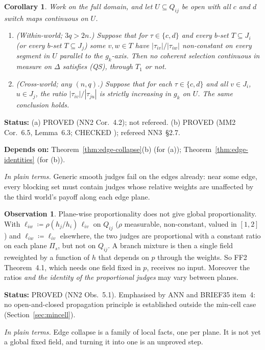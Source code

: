 \documentclass[11pt]{article}
\newtheorem{corollary}[theorem]{Corollary}
\theoremstyle{definition}
\newtheorem{observation}[theorem]{Observation}
\theoremstyle{remark}
\newcommand{\src}[1]{\textsf{#1}}
\newcommand{\status}[1]{\par\smallskip\noindent\textbf{Status:} #1\par}
\newcommand{\deps}[1]{\noindent\textbf{Depends on:} #1\par}
\newcommand{\inwords}[1]{\noindent\textit{In plain terms.} #1\par\smallskip}
\newcommand{\QS}{\textup{(QS)}}
\begin{document}
\begin{corollary}\label{cor:edge-exclusions}
Work on the full domain, and let $U\subseteq Q_{ij}$ be open with all $c$ and $d$ switch maps continuous on $U$.
\begin{enumerate}[label=(\alph*)]
\item \emph{(Within-world; $3q>2n$.)} Suppose that for $\tau\in\{c,d\}$ and every $b$-set $T\subseteq J_i$ (or every $b$-set $T\subseteq J_j$) some $v,w\in T$ have $|\tau_{iv}|/|\tau_{iw}|$ non-constant on every segment in $U$ parallel to the $g_k$-axis. Then no coherent selection continuous in measure on $\Delta$ satisfies \QS, through $T_1$ or not.
\item \emph{(Cross-world; any $(n,q)$.)} Suppose that for each $\tau\in\{c,d\}$ and all $v\in J_i$, $u\in J_j$, the ratio $|\tau_{iv}|/|\tau_{ju}|$ is strictly increasing in $g_k$ on $U$. The same conclusion holds.
\end{enumerate}
\end{corollary}
\status{(a) PROVED (\src{NN2} Cor.~4.2); not refereed. (b) PROVED (\src{MM2} Cor.~6.5, Lemma~6.3; CHECKED \file{mm2py/edge_ratio.out}); refereed \src{NN3}~\S2.7.}
\deps{Theorem~\ref{thm:edge-collapse}(b) (for (a)); Theorem~\ref{thm:edge-identities} (for (b)).}
\inwords{Generic smooth judges fail on the edges already: near some edge, every blocking set must contain judges whose relative weights are unaffected by the third world's payoff along each edge plane.}

\begin{observation}\label{obs:planewise}
Plane-wise proportionality does not give global proportionality. With $\ell_{iw}\coloneqq\rho(h_j/h_i)\,\ell_{iv}$ on $Q_{ij}$ ($\rho$ measurable, non-constant, valued in $[1,2]$) and $\ell_{iw}\coloneqq\ell_{iv}$ elsewhere, the two judges are proportional with a constant ratio on each plane $\Pi_s$, but not on $Q_{ij}$. A branch mixture is then a single field reweighted by a function of $h$ that depends on $p$ through the weights. So \src{FF2} Theorem~4.1, which needs one field fixed in $p$, receives no input. Moreover the ratios \emph{and the identity of the proportional judges} may vary between planes.
\end{observation}
\status{PROVED (\src{NN2} Obs.~5.1). Emphasised by \src{ANN} and \src{BRIEF35} item~4: no open-and-closed propagation principle is established outside the min-cell case (Section~\ref{sec:mincell}).}
\inwords{Edge collapse is a family of local facts, one per plane. It is not yet a global fixed field, and turning it into one is an unproved step.}
\end{document}
